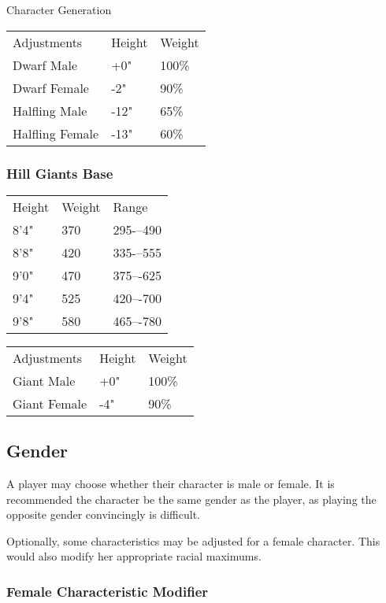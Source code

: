\begin{Chapter}{Character Generation}
\begin{tabularx}{\columnwidth}{lll} \\
Adjustments		& Height	& Weight \\
Dwarf Male		& +0"		& 100\% \\
Dwarf Female		& -2"		& 90\% \\
Halﬂing Male		& -12"		& 65\% \\
Halﬂing Female		& -13"		& 60\% \\
\end{tabularx}

\subsubsection{Hill Giants Base}


\begin{tabularx}{\columnwidth}{lll}
Height		& Weight	& Range \\
8’4"		& 370		& 295-–490 \\
8’8"		& 420		& 335-–555 \\
9’0"		& 470		& 375–-625 \\
9’4"		& 525		& 420–-700 \\
9’8"		& 580		& 465–-780 \\
\end{tabularx}

\begin{tabularx}{\columnwidth}{lll}
Adjustments	& Height	& Weight \\
Giant Male	& +0"		& 100\% \\
Giant Female	& -4"		& 90\% \\
\end{tabularx}

\subsection{Gender}

A player may choose whether their character is male or female. It is
recommended the character be the same gender as the player, as playing
the opposite gender convincingly is difficult.

Optionally, some characteristics may be adjusted for a female
character.  This would also modify her appropriate racial maximums.

\subsubsection{Female Characteristic Modifier}


\end{Chapter}
